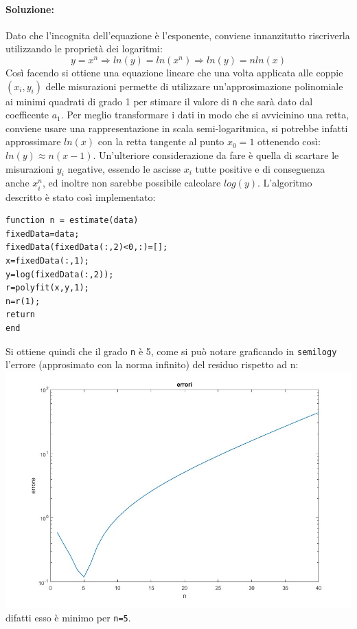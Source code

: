 \documentclass[12pt]{article}
\begin{document}
\paragraph{Soluzione:} 
Dato che l'incognita dell'equazione è l'esponente, conviene innanzitutto riscriverla utilizzando le proprietà dei logaritmi: \\
$$ y=x^{n} \Rightarrow ln(y)=ln(x^{n}) \Rightarrow ln(y)=nln(x)$$
Così facendo si ottiene una equazione lineare che una volta applicata alle coppie \((x_i,y_i)\) delle misurazioni 
permette di utilizzare un'approsimazione polinomiale ai minimi quadrati di grado 1 per stimare il valore di \texttt{n} che sarà dato dal coefficente \(a_1\). 
Per meglio transformare i dati in modo che si avvicinino una retta, conviene usare una rappresentazione in scala semi-logaritmica,
 si potrebbe infatti approssimare \(ln(x)\) con la retta tangente al punto \(x_{0}=1\) ottenendo così:
\(ln(y) \approx n(x-1)\). Un'ulteriore considerazione da fare è quella di scartare le misurazioni \(y_i\) negative, 
essendo le ascisse \(x_i\) tutte positive e di conseguenza anche \(x_i^{n}\), ed inoltre non sarebbe possibile calcolare \(log(y)\).
L'algoritmo descritto è stato così implementato:
\begin{lstlisting}[frame=single]
function n = estimate(data)
fixedData=data;
fixedData(fixedData(:,2)<0,:)=[];
x=fixedData(:,1);
y=log(fixedData(:,2));
r=polyfit(x,y,1);
n=r(1);
return
end
\end{lstlisting}
Si ottiene quindi che il grado \texttt{n} è 5, come si può notare graficando in \texttt{semilogy} l'errore (approsimato con la norma infinito) del residuo rispetto ad n: \\
\includegraphics[width=\linewidth]{errori24.jpg}
difatti esso è minimo per \texttt{n=5}.
\end{document}
